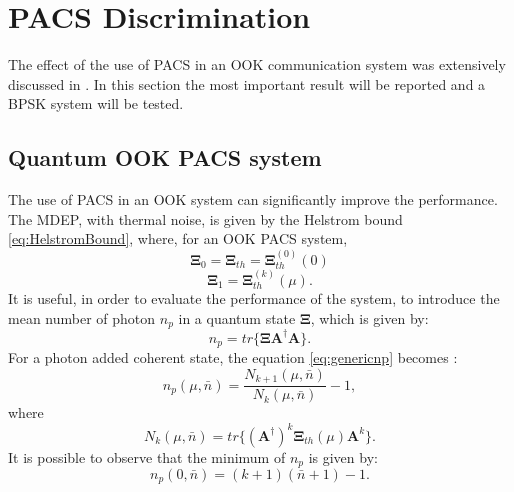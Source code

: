 \section{PACS Discrimination}
    The effect of the use of PACS in an OOK communication system was extensively discussed in
    \cite{PACSDisc}. In this section the most important result will be reported and a BPSK
    system will be tested.

    \subsection{Quantum OOK PACS system}
    The use of PACS in an OOK system can significantly improve the performance. The MDEP, with
    thermal noise, is given by the Helstrom bound \ref{eq:HelstromBound}, where, for an OOK PACS
    system,
    \begin{equation}
        \pmb{\Xi}_0 =  \pmb{\Xi}_{th} = \pmb{\Xi}_{th}^{(0)}(0)
    \end{equation}
    \begin{equation*}
        \pmb{\Xi}_1 =  \pmb{\Xi}_{th}^{(k)}(\mu).
    \end{equation*}
    It is useful, in order to evaluate the performance of the system, to introduce the mean number
    of photon $n_p$ in a quantum state $\pmb{\Xi}$, which is given by:
    \begin{equation}
        n_p = tr\{\pmb{\Xi}\pmb{A}^\dagger\pmb{A}\}.
        \label{eq:genericnp}
    \end{equation}
    For a photon added coherent state, the equation \ref{eq:genericnp} becomes \cite{PACSDisc}:
    \begin{equation}
        n_p(\mu,\bar{n}) = \frac{N_{k+1}(\mu,\bar{n})}{N_k(\mu,\bar{n})}-1,
        \label{eq:np}
    \end{equation}
    where
    \begin{equation}
        N_k(\mu,\bar{n}) = tr\{(\pmb{A}^\dagger)^k \pmb{\Xi}_{th}(\mu) \pmb{A}^k\}.
    \end{equation}
    It is possible to observe that the minimum of $n_p$ is given by:
    \begin{equation}
        n_p(0,\bar{n}) = (k+1)(\bar{n}+1)-1.
    \end{equation}

